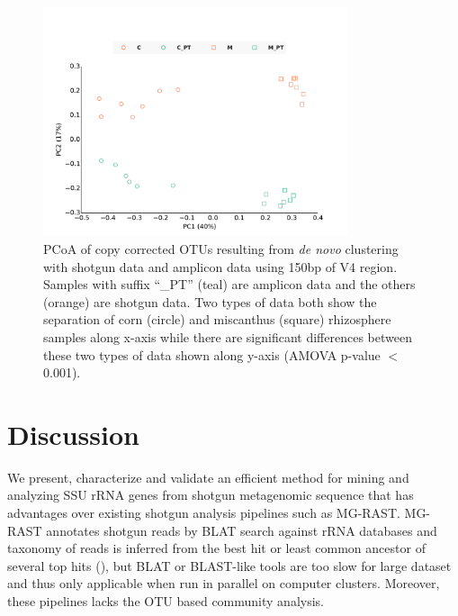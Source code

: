 \documentclass[12pt]{article}
\begin{document}
\begin{figure}[tbph!]
  \centering
  \includegraphics[width=0.8\textwidth]{figs/V4-SG+PT-CC-pcoa}
  \caption[PCoA of copy corrected OTUs resulting from {\em de novo} clustering with shotgun data and amplicon data using 150bp of V4 region]{PCoA of copy corrected OTUs resulting from {\em de novo} clustering with shotgun data and amplicon data using 150bp of V4 region. Samples with suffix ``\_PT'' (teal) are amplicon data and the others (orange) are shotgun data. Two types of data both show the separation of corn (circle) and miscanthus (square) rhizosphere samples along x-axis while there are significant differences between these two types of data shown along y-axis (AMOVA p-value $<$ 0.001).}
  \label{fig:V4-SG+PT-CC-pcoa}
\end{figure}


\section{Discussion}
  We present, characterize and validate an efficient method for mining and analyzing SSU rRNA genes from shotgun metagenomic sequence that has advantages over existing shotgun analysis pipelines such as MG-RAST. MG-RAST annotates shotgun reads by BLAT search against rRNA databases and taxonomy of reads is inferred from the best hit or least common ancestor of several top hits (\cite{blast,blat,mgrast}), but BLAT or BLAST-like tools are too slow for large dataset and thus only applicable when run in parallel on computer clusters. Moreover, these pipelines lacks the OTU based community analysis.
\end{document}
